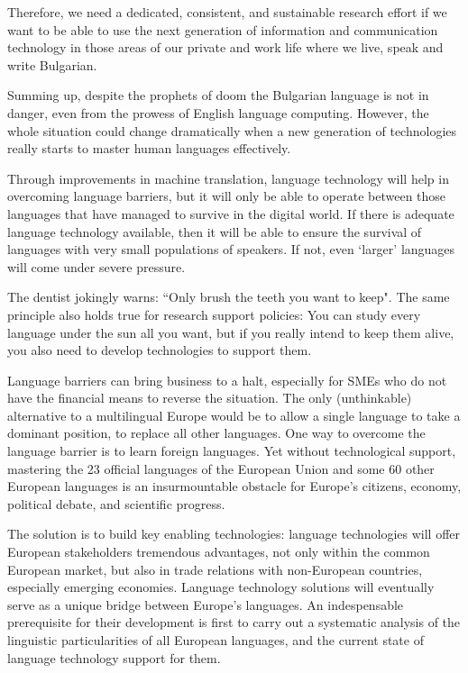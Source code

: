 \begin{multicols}{2}
Therefore, we need a dedicated, consistent, and sustainable research effort if we want to be able to use the next generation of information and communication technology in those areas of our private and work life where we live, speak and write Bulgarian.

Summing up, despite the prophets of doom the Bulgarian language is not in danger, even from the prowess of English language computing. However, the whole situation could change dramatically when a new generation of technologies really starts to master human languages effectively. 

Through improvements in machine translation, language technology will help in overcoming language barriers, but it will only be able to operate between those languages that have managed to survive in the digital world. If there is adequate language technology available, then it will be able to ensure the survival of languages with very small populations of speakers. If not, even ‘larger’ languages will come under severe pressure. 

The dentist jokingly warns: ``Only brush the teeth you want to keep". The same principle also holds true for research support policies: You can study every language under the sun all you want, but if you really intend to keep them alive, you also need to develop technologies to support them.

Language barriers can bring business to a halt, especially for SMEs who do not have the financial means to reverse the situation. The only (unthinkable) alternative to a multilingual Europe would be to allow a single language to take a dominant position, to replace all other languages. One way to overcome the language barrier is to learn foreign languages. Yet without technological support, mastering the 23 official languages of the European Union and some 60 other European languages is an insurmountable obstacle for Europe’s citizens, economy, political debate, and scientific progress.


The solution is to build key enabling technologies: language technologies will offer European stakeholders tremendous advantages, not only within the common European market, but also in trade relations with non-European countries, especially emerging economies. Language technology solutions will eventually serve as a unique bridge between Europe's languages. An indespensable prerequisite for their development is first to carry out a systematic analysis of the linguistic particularities of all European languages, and the current state of language technology support for them.


\end{multicols}
